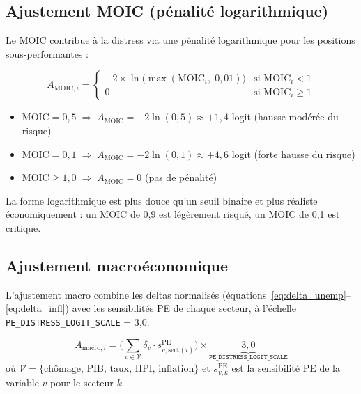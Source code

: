 \documentclass[12pt,a4paper]{article}
\begin{document}
\subsection{Ajustement MOIC (p\'{e}nalit\'{e} logarithmique)}

Le MOIC contribue \`{a} la distress via une p\'{e}nalit\'{e} logarithmique pour les positions
sous-performantes :

\begin{formulebox}
\begin{equation}
\label{eq:moic_adj}
A_{\mathrm{MOIC},i} = \begin{cases}
-2 \times \ln\!\bigl(\max(\mathrm{MOIC}_i,\; 0{,}01)\bigr) & \text{si } \mathrm{MOIC}_i < 1 \\
0 & \text{si } \mathrm{MOIC}_i \geq 1
\end{cases}
\end{equation}
\end{formulebox}

\begin{interpretbox}
\begin{itemize}[nosep]
    \item $\mathrm{MOIC} = 0{,}5 \;\Rightarrow\; A_{\mathrm{MOIC}} = -2 \ln(0{,}5) \approx +1{,}4$ logit (hausse mod\'{e}r\'{e}e du risque)
    \item $\mathrm{MOIC} = 0{,}1 \;\Rightarrow\; A_{\mathrm{MOIC}} = -2 \ln(0{,}1) \approx +4{,}6$ logit (forte hausse du risque)
    \item $\mathrm{MOIC} \geq 1{,}0 \;\Rightarrow\; A_{\mathrm{MOIC}} = 0$ (pas de p\'{e}nalit\'{e})
\end{itemize}
La forme logarithmique est plus douce qu'un seuil binaire et plus r\'{e}aliste
\'{e}conomiquement : un MOIC de 0{,}9 est l\'{e}g\`{e}rement risqu\'{e}, un MOIC de 0{,}1 est critique.
\end{interpretbox}

\subsection{Ajustement macro\'{e}conomique}

L'ajustement macro combine les deltas normalis\'{e}s (\'{e}quations~\eqref{eq:delta_unemp}--\eqref{eq:delta_infl})
avec les sensibilit\'{e}s PE de chaque secteur, \`{a} l'\'{e}chelle \texttt{PE\_DISTRESS\_LOGIT\_SCALE} = 3{,}0.

\begin{formulebox}
\begin{equation}
\label{eq:macro_adj}
A_{\mathrm{macro},i} = \Biggl(
\sum_{v \in \mathcal{V}} \delta_v \cdot s_{v,\mathrm{sect}(i)}^{\mathrm{PE}}
\Biggr) \times \underbrace{3{,}0}_{\texttt{PE\_DISTRESS\_LOGIT\_SCALE}}
\end{equation}
o\`{u} $\mathcal{V} = \{\text{ch\^{o}mage, PIB, taux, HPI, inflation}\}$ et $s_{v,k}^{\mathrm{PE}}$ est la
sensibilit\'{e} PE de la variable $v$ pour le secteur $k$.
\end{formulebox}
\end{document}
